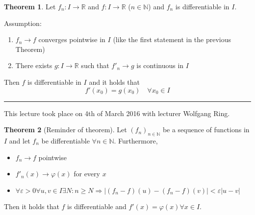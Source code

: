 \documentclass[a4paper,landscape,twocolumn]{article}
\theoremstyle{definition}
\newtheorem{theorem}{Theorem}
\newcommand\abs[1]{\left|#1\right|}
\newcommand\meta[3]{\hrule{} This #1 took place on #2 with lecturer #3.\par}
\begin{document}
\begin{theorem}
  Let $f_n: I \to \mathbb R$ and $f: I \to \mathbb R$ ($n \in \mathbb N$)
  and $f_n$ is differentiable in $I$.

  Assumption:
  \begin{enumerate}
    \item $f_n \to f$ converges pointwise in $I$
      (like the first statement in the previous Theorem)
    \item There exists $g: I \to \mathbb R$ such that
      $f'_n \to g$ is continuous in $I$
  \end{enumerate}
  Then $f$ is differentiable in $I$ and it holds that
  \[ f'(x_0) = g(x_0) \quad \forall x_0 \in I \]
\end{theorem}

\meta{lecture}{4th of March 2016}{Wolfgang Ring}

\begin{theorem}[Reminder of theorem]
  \label{thm:diff-conv}
  Let $(f_n)_{n\in\mathbb N}$ be a sequence of functions in $I$ and
  let $f_n$ be differentiable $\forall n \in \mathbb N$. Furthermore,
  \begin{itemize}
    \item $f_n \to f$ pointwise
    \item $f'_n(x) \to \varphi(x)$ for every $x$
    \item $\forall \varepsilon > 0 \forall u,v \in I \exists N: n \geq N
      \Rightarrow \abs{(f_n - f)(u) - (f_n - f)(v)} < \varepsilon \abs{u - v}$
  \end{itemize}
  Then it holds that $f$ is differentiable and $f'(x) = \varphi(x) \forall x \in I$.
\end{theorem}
\end{document}
